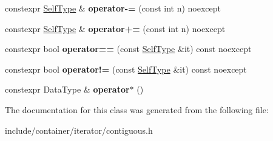 \begin{DoxyCompactItemize}
constexpr \hyperlink{classbzd_1_1iterator_1_1Contiguous}{Self\+Type} \& {\bfseries operator-\/=} (const int n) noexcept
\item 
\mbox{\label{classbzd_1_1iterator_1_1Contiguous_a28ac26d40406b190355dab30f14faef1}} 
constexpr \hyperlink{classbzd_1_1iterator_1_1Contiguous}{Self\+Type} \& {\bfseries operator+=} (const int n) noexcept
\item 
\mbox{\label{classbzd_1_1iterator_1_1Contiguous_a8a9f649c6a1cf72464be16499b13ef5c}} 
constexpr bool {\bfseries operator==} (const \hyperlink{classbzd_1_1iterator_1_1Contiguous}{Self\+Type} \&it) const noexcept
\item 
\mbox{\label{classbzd_1_1iterator_1_1Contiguous_aa9900f90605b0d8ee6e4a5c630f845e9}} 
constexpr bool {\bfseries operator!=} (const \hyperlink{classbzd_1_1iterator_1_1Contiguous}{Self\+Type} \&it) const noexcept
\item 
\mbox{\label{classbzd_1_1iterator_1_1Contiguous_ab30a6693512b64cc32297769e4f31aef}} 
constexpr Data\+Type \& {\bfseries operator$\ast$} ()
\end{DoxyCompactItemize}


The documentation for this class was generated from the following file\+:\begin{DoxyCompactItemize}
\item 
include/container/iterator/contiguous.\+h\end{DoxyCompactItemize}
